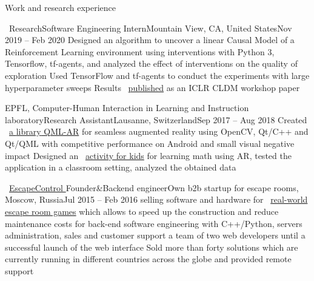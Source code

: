 \documentclass{resume} %
\newcommand*{\img}[1]{%
	\raisebox{-.02\baselineskip}{%
		\texttt{[image: \#1]}%
	}%
}
\newcommand*{\emoji}[1]{\img{./emoji/\imgpref#1.png}}
\newcommand*{\mybold}[1]{{\color{gray} #1}}
\def\imgpref{bleak-}
\newcommand{\mylink}{{\color{gray}\faExternalLink}}
\begin{document}
\begin{rSection}{Work and research experience}
	\begin{rSubsection}{{\large\vspace*{-0.7mm}\google}\ Research}{Software Engineering Intern}{Mountain View, CA, United States}{Nov 2019 -- Feb 2020}
		\myitem Designed an algorithm to uncover a linear \mybold{Causal Model} of a \mybold{Reinforcement Learning} environment using interventions with \mybold{Python 3, Tensorflow, tf-agents}, and analyzed the effect of interventions on the quality of exploration
		\myitem Used TensorFlow and tf-agents to conduct the experiments with large hyperparameter sweeps
		\myitem Results \mylink~\href{https://arxiv.org/abs/2002.05217}{published} as an ICLR CLDM workshop paper
	\end{rSubsection}

	\begin{rSubsection}{EPFL, Computer-Human Interaction in Learning and Instruction laboratory}{Research Assistant}{Lausanne, Switzerland}{Sep 2017 -- Aug 2018}
		\myitem Created \mylink~\href{https://github.com/chili-epfl/qml-ar}{a \mybold{library} QML-AR} for seamless \mybold{augmented reality} using \mybold{OpenCV, Qt/C++ and Qt/QML} with competitive performance on Android and small visual negative impact
		\myitem Designed an \mylink~\href{https://youtu.be/B4-2qYsAKH4}{activity for kids} for learning math using AR, tested the application in a classroom setting, analyzed the obtained data
	\end{rSubsection}


	\begin{rSubsection}{\mylink~\href{http://escape-control.com}{EscapeControl \emoji{old-key}}}{Founder\&Backend engineer}{Own b2b startup for escape rooms, Moscow, Russia}{Jul 2015 -- Feb 2016}
		\myitem \mybold{Created a startup} selling software and hardware for \mylink~\href{https://www.youtube.com/watch?v=kXbubjs7aTA}{real-world escape room games} which allows to speed up the construction and reduce maintenance costs
		\myitem \mybold{Responsible} for back-end software engineering with \mybold{C++/Python}, servers administration, sales and customer support
		\myitem \mybold{Managed} a team of two web developers until a successful launch of the web interface
		\myitem Sold more than forty solutions which are currently running in different countries across the globe and provided remote support
	\end{rSubsection}



\end{rSection}
\end{document}
